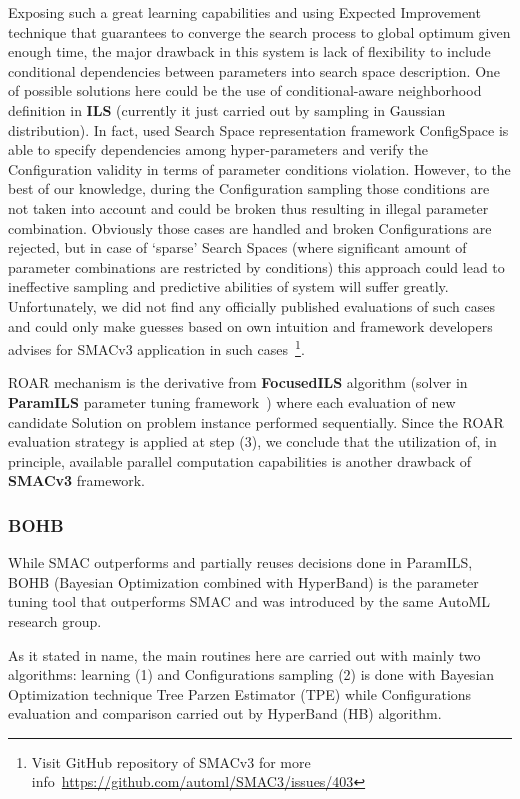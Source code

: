 Exposing such a great learning capabilities and using Expected Improvement technique that guarantees to converge the search process to global optimum given enough time, the major drawback in this system is lack of flexibility to include conditional dependencies between parameters into search space description. 
One of possible solutions here could be the use of conditional-aware neighborhood definition in \textbf{ILS} (currently it just carried out by sampling in Gaussian distribution). In fact, used Search Space representation framework ConfigSpace\cite{configspace} is able to specify dependencies among hyper-parameters and verify the Configuration validity in terms of parameter conditions violation. However, to the best of our knowledge, during the Configuration sampling those conditions are not taken into account and could be broken thus resulting in illegal parameter combination. Obviously those cases are handled and broken Configurations are rejected, but in case of `sparse' Search Spaces (where significant amount of parameter combinations are restricted by conditions) this approach could lead to ineffective sampling and predictive abilities of system will suffer greatly. Unfortunately, we did not find any officially published evaluations of such cases and could only make guesses based on own intuition and framework developers advises for SMACv3 application in such cases~\footnote{Visit GitHub repository of SMACv3 for more info~\url{https://github.com/automl/SMAC3/issues/403}}.

ROAR mechanism is the derivative from \textbf{FocusedILS} algorithm (solver in \textbf{ParamILS} parameter tuning framework~\cite{hutter2009paramils}) where each evaluation of new candidate Solution on problem instance performed sequentially. Since the ROAR evaluation strategy is applied at step (3), we conclude that the utilization of, in principle, available parallel computation capabilities is another drawback of \textbf{SMACv3} framework.


\subsubsection{BOHB~\cite{falkner2018bohb}}\label{bg: bohb}
While SMAC outperforms and partially reuses decisions done in ParamILS, BOHB (Bayesian Optimization combined with HyperBand) is the parameter tuning tool that outperforms SMAC and was introduced by the same AutoML research group.

As it stated in name, the main routines here are carried out with mainly two algorithms: learning (1) and Configurations sampling (2) is done with Bayesian Optimization technique Tree Parzen Estimator (TPE) while Configurations evaluation and comparison carried out by HyperBand (HB) algorithm.

